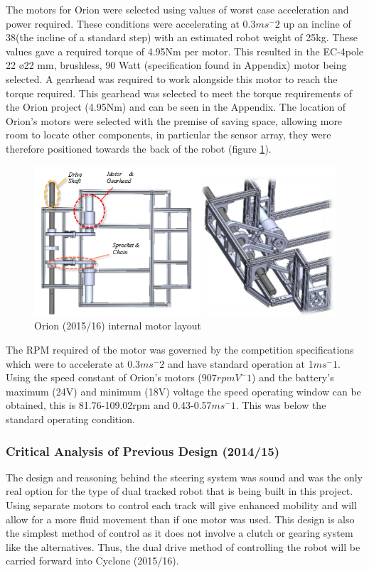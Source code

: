 The motors for Orion were selected using values of worst case acceleration and power required. These conditions were accelerating at 0.3$ms^-2$ up an incline of 38\textordmasculine (the incline of a standard step) with an estimated robot weight of 25kg. These values gave a required torque of 4.95Nm per motor. This resulted in the EC-4pole 22 \o22 mm, brushless, 90 Watt (specification found in Appendix) motor being selected. A gearhead was required to work alongside this motor to reach the torque required. This gearhead was selected to meet the torque requirements of the Orion project (4.95Nm) and can be seen in the Appendix. The location of Orion’s motors were selected with the premise of saving space, allowing more room to locate other components, in particular the sensor array, they were therefore positioned towards the back of the robot (figure \ref{fig:Orionmotorlayout}).\par

\begin{figure}[h]
\centering\includegraphics[width=0.6\linewidth]{Images/DT_Fig_1.png}
\caption{Orion (2015/16) internal motor layout}
\label{fig:Orionmotorlayout}
\end{figure}

The RPM required of the motor was governed by the competition specifications which were to accelerate at 0.3$ms^-2$ and have standard operation at 1$ms^-1$. Using the speed constant of Orion’s motors ($907 rpmV^-1$) and the battery’s maximum (24V) and minimum (18V) voltage the speed operating window can be obtained, this is 81.76-109.02rpm and 0.43-0.57$ms^-1$. This was below the  standard operating condition.\par

\subsubsection{Critical Analysis of Previous Design (2014/15)}
The design and reasoning behind the steering system was sound and was the only real option for the type of dual tracked robot that is being built in this project. Using separate motors to control each track will give enhanced mobility and will allow for a more fluid movement than if one motor was used. This design is also the simplest method of control as it does not involve a clutch or gearing system like the alternatives. Thus, the dual drive method of controlling the robot will be carried forward into Cyclone (2015/16).\par

